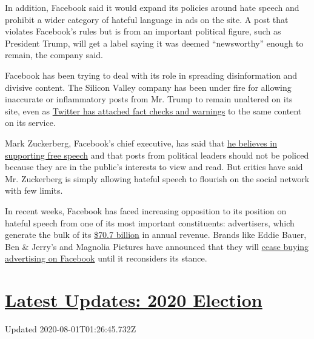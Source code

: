 In addition, Facebook said it would expand its policies around hate
speech and prohibit a wider category of hateful language in ads on the
site. A post that violates Facebook's rules but is from an important
political figure, such as President Trump, will get a label saying it
was deemed ``newsworthy'' enough to remain, the company said.

Facebook has been trying to deal with its role in spreading
disinformation and divisive content. The Silicon Valley company has been
under fire for allowing inaccurate or inflammatory posts from Mr. Trump
to remain unaltered on its site, even as
\href{https://www.nytimes.com/2020/05/30/technology/twitter-trump-dorsey.html}{Twitter
has attached fact checks and warnings} to the same content on its
service.

Mark Zuckerberg, Facebook's chief executive, has said that
\href{https://www.nytimes.com/2019/10/17/business/zuckerberg-facebook-free-speech.html}{he
believes in supporting free speech} and that posts from political
leaders should not be policed because they are in the public's interests
to view and read. But critics have said Mr. Zuckerberg is simply
allowing hateful speech to flourish on the social network with few
limits.

In recent weeks, Facebook has faced increasing opposition to its
position on hateful speech from one of its most important constituents:
advertisers, which generate the bulk of its
\href{https://investor.fb.com/investor-news/press-release-details/2020/Facebook-Reports-Fourth-Quarter-and-Full-Year-2019-Results/default.aspx}{\$70.7
billion} in annual revenue. Brands like Eddie Bauer, Ben \& Jerry's and
Magnolia Pictures have announced that they will
\href{https://www.nytimes.com/2020/06/23/business/media/facebook-ad-boycott.html}{cease
buying advertising on Facebook} until it reconsiders its stance.

\hypertarget{latest-updates-2020-election}{%
\section{\texorpdfstring{\href{https://www.nytimes.com/2020/07/31/us/elections/biden-vs-trump.html?action=click\&pgtype=Article\&state=default\&region=MAIN_CONTENT_1\&context=storylines_live_updates}{Latest
Updates: 2020
Election}}{Latest Updates: 2020 Election}}\label{latest-updates-2020-election}}

Updated 2020-08-01T01:26:45.732Z

